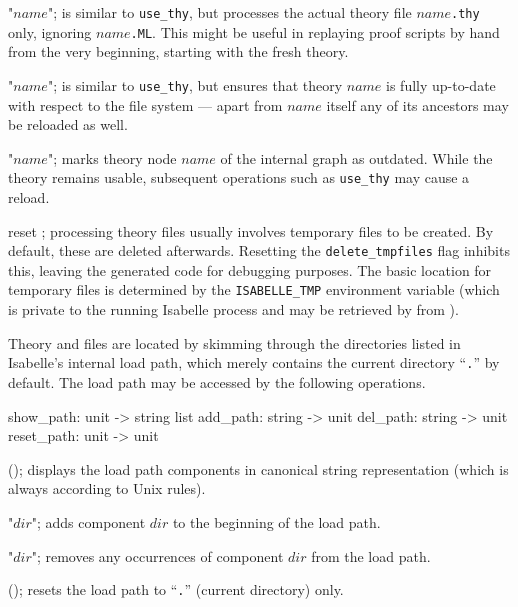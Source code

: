 \begin{ttdescription}
\item[\ttindexbold{use_thy_only} "$name$";] is similar to \texttt{use_thy},
  but processes the actual theory file $name$\texttt{.thy} only, ignoring
  $name$\texttt{.ML}.  This might be useful in replaying proof scripts by hand
  from the very beginning, starting with the fresh theory.
  
\item[\ttindexbold{update_thy} "$name$";] is similar to \texttt{use_thy}, but
  ensures that theory $name$ is fully up-to-date with respect to the file
  system --- apart from $name$ itself any of its ancestors may be reloaded as
  well.
  
\item[\ttindexbold{touch_thy} "$name$";] marks theory node $name$ of the
  internal graph as outdated.  While the theory remains usable, subsequent
  operations such as \texttt{use_thy} may cause a reload.
  
\item[reset \ttindexbold{delete_tmpfiles};] processing theory files usually
  involves temporary {\ML} files to be created.  By default, these are deleted
  afterwards.  Resetting the \texttt{delete_tmpfiles} flag inhibits this,
  leaving the generated code for debugging purposes.  The basic location for
  temporary files is determined by the \texttt{ISABELLE_TMP} environment
  variable (which is private to the running Isabelle process and may be
  retrieved by  from {\ML}).
\end{ttdescription}

\medskip Theory and {\ML} files are located by skimming through the
directories listed in Isabelle's internal load path, which merely contains the
current directory ``\texttt{.}'' by default.  The load path may be accessed by
the following operations.

\begin{ttbox}
show_path: unit -> string list
add_path: string -> unit
del_path: string -> unit
reset_path: unit -> unit
\end{ttbox}

\begin{ttdescription}
\item[\ttindexbold{show_path}();] displays the load path components in
  canonical string representation (which is always according to Unix rules).
  
\item[\ttindexbold{add_path} "$dir$";] adds component $dir$ to the beginning
  of the load path.
  
\item[\ttindexbold{del_path} "$dir$";] removes any occurrences of component
  $dir$ from the load path.
  
\item[\ttindexbold{reset_path}();] resets the load path to ``\texttt{.}''
  (current directory) only.
\end{ttdescription}

